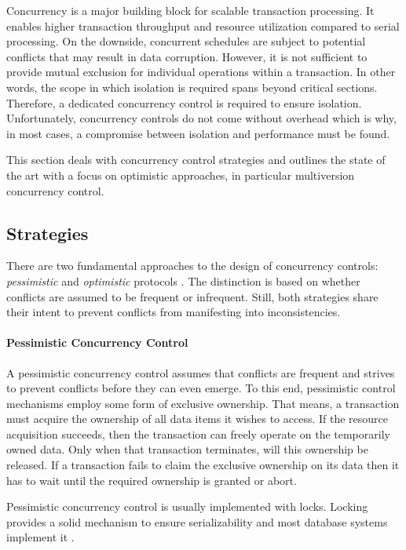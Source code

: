 Concurrency is a major building block for scalable transaction processing. It
enables higher transaction throughput and resource utilization compared to
serial processing. On the downside, concurrent schedules are subject to
potential conflicts that may result in data corruption. However, it is not
sufficient to provide mutual exclusion for individual operations within a
transaction. In other words, the scope in which isolation is required spans
beyond critical sections. Therefore, a dedicated concurrency control is required
to ensure isolation. Unfortunately, concurrency controls do not come without overhead which is why, in most cases, a compromise between isolation and performance must be found.

This section deals with concurrency control strategies and outlines the state of
the art with a focus on optimistic approaches, in particular multiversion
concurrency control.

\subsection{Strategies}

There are two fundamental approaches to the design of concurrency controls:
\emph{pessimistic} and \emph{optimistic} protocols \cite{kung1981optimistic,
larson2011high, sadoghi2014reducing}. The distinction is based on whether
conflicts are assumed to be frequent or infrequent. Still, both strategies share
their intent to prevent conflicts from manifesting into inconsistencies.

\paragraph{Pessimistic Concurrency Control}

A pessimistic concurrency control assumes that conflicts are frequent and
strives to prevent conflicts before they can even emerge. To this end,
pessimistic control mechanisms employ some form of exclusive ownership. That
means, a transaction must acquire the ownership of all data items it wishes to
access. If the resource acquisition succeeds, then the transaction can freely
operate on the temporarily owned data. Only when that transaction terminates,
will this ownership be released. If a transaction fails to claim the exclusive
ownership on its data then it has to wait until the required ownership is
granted or abort.

Pessimistic concurrency control is usually implemented with locks. Locking
provides a solid mechanism to ensure serializability and most database systems
implement it \cite{kung1981optimistic, berenson1995critique, larson2011high}.

